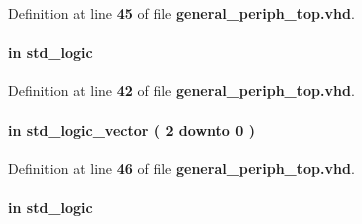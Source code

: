 Definition at line {\bf 45} of file {\bf general\+\_\+periph\+\_\+top.\+vhd}.

\paragraph[{led2\+\_\+clk}]{ {\bfseries \textcolor{keywordflow}{in}\textcolor{vhdlchar}{ }} {\bfseries \textcolor{comment}{std\+\_\+logic}\textcolor{vhdlchar}{ }} \hspace{0.3cm}{\ttfamily [Port]}}\label{classgeneral__periph__top_a7d3464e443acb54ce371f90bd642cd47}


Definition at line {\bf 42} of file {\bf general\+\_\+periph\+\_\+top.\+vhd}.

\paragraph[{led2\+\_\+ctrl}]{ {\bfseries \textcolor{keywordflow}{in}\textcolor{vhdlchar}{ }} {\bfseries \textcolor{comment}{std\+\_\+logic\+\_\+vector}\textcolor{vhdlchar}{ }\textcolor{vhdlchar}{(}\textcolor{vhdlchar}{ }\textcolor{vhdlchar}{ } \textcolor{vhdldigit}{2} \textcolor{vhdlchar}{ }\textcolor{keywordflow}{downto}\textcolor{vhdlchar}{ }\textcolor{vhdlchar}{ } \textcolor{vhdldigit}{0} \textcolor{vhdlchar}{ }\textcolor{vhdlchar}{)}\textcolor{vhdlchar}{ }} \hspace{0.3cm}{\ttfamily [Port]}}\label{classgeneral__periph__top_a5c0409b86e13de4b2d0c0620b559dbc6}


Definition at line {\bf 46} of file {\bf general\+\_\+periph\+\_\+top.\+vhd}.

\paragraph[{led2\+\_\+dac\+\_\+ss}]{ {\bfseries \textcolor{keywordflow}{in}\textcolor{vhdlchar}{ }} {\bfseries \textcolor{comment}{std\+\_\+logic}\textcolor{vhdlchar}{ }} \hspace{0.3cm}{\ttfamily [Port]}}\label{classgeneral__periph__top_a0dcbe83a34907e5a01361731ab3f5bd9}


